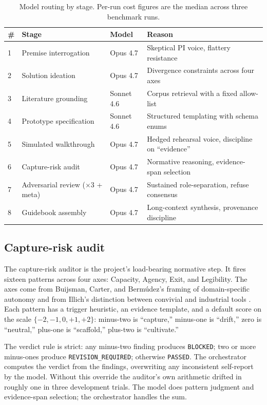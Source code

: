 \begin{table}[t]
\centering
\small
\caption{Model routing by stage. Per-run cost figures are the median across three benchmark runs.}
\label{tab:routing}
\begin{tabular}{@{}llll@{}}
\toprule
\# & Stage & Model & Reason \\
\midrule
1 & Premise interrogation & Opus 4.7 & Skeptical PI voice, flattery resistance \\
2 & Solution ideation & Opus 4.7 & Divergence constraints across four axes \\
3 & Literature grounding & Sonnet 4.6 & Corpus retrieval with a fixed allow-list \\
4 & Prototype specification & Sonnet 4.6 & Structured templating with schema enums \\
5 & Simulated walkthrough & Opus 4.7 & Hedged rehearsal voice, discipline on ``evidence'' \\
6 & Capture-risk audit & Opus 4.7 & Normative reasoning, evidence-span selection \\
7 & Adversarial review ($\times 3$ + meta) & Opus 4.7 & Sustained role-separation, refuse consensus \\
8 & Guidebook assembly & Opus 4.7 & Long-context synthesis, provenance discipline \\
\bottomrule
\end{tabular}
\end{table}

\subsection{Capture-risk audit}

The capture-risk auditor is the project's load-bearing normative step. It fires sixteen patterns across four axes: Capacity, Agency, Exit, and Legibility. The axes come from Buijsman, Carter, and Bermúdez's framing of domain-specific autonomy \citep{buijsman2025autonomy} and from Illich's distinction between convivial and industrial tools \citep{illich1973conviviality}. Each pattern has a trigger heuristic, an evidence template, and a default score on the scale $\{-2, -1, 0, +1, +2\}$: minus-two is ``capture,'' minus-one is ``drift,'' zero is ``neutral,'' plus-one is ``scaffold,'' plus-two is ``cultivate.''

The verdict rule is strict: any minus-two finding produces \texttt{BLOCKED}; two or more minus-ones produce \texttt{REVISION\_REQUIRED}; otherwise \texttt{PASSED}. The orchestrator computes the verdict from the findings, overwriting any inconsistent self-report by the model. Without this override the auditor's own arithmetic drifted in roughly one in three development trials. The model does pattern judgment and evidence-span selection; the orchestrator handles the sum.

